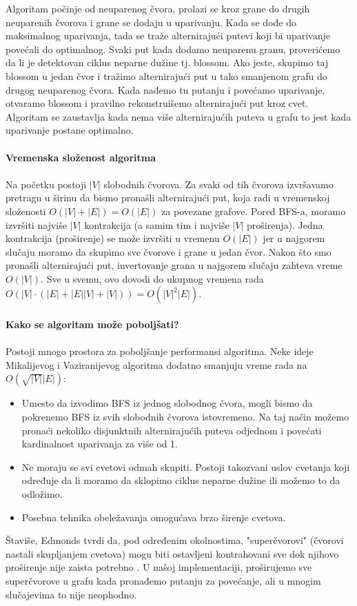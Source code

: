 \documentclass[a4paper]{article}
\theoremstyle{definition}
\begin{document}
Algoritam počinje od neuparenog čvora, prolazi se kroz grane do drugih neuparenih čvorova i grane se dodaju u uparivanju. Kada se dođe do maksimalnog uparivanja, tada se traže alternirajući putevi koji bi uparivanje povećali do optimalnog. Svaki put kada dodamo neuparenu granu, proverićemo da li je detektovan ciklus neparne dužine tj. blossom. Ako jeste, skupimo taj blossom u jedan čvor i tražimo alternirajući put u tako smanjenom grafu do drugog neuparenog čvora. Kada nađemo tu putanju i povećamo uparivanje, otvaramo blossom i pravilno rekonstruišemo alternirajući put kroz cvet.\\ Algoritam se zaustavlja kada nema više alternirajućih puteva u grafu to jest kada uparivanje postane optimalno.
\\
\\
\textbf{Vremenska složenost algoritma}\\ \\
Na početku postoji $|V|$ slobodnih čvorova. Za svaki od tih čvorova izvršavamo pretragu u širinu da bismo pronašli alternirajući put, koja radi u vremenskoj složenosti $O(|V|+|E|) = O(|E|)$ za povezane grafove. Pored BFS-a, moramo izvršiti najviše $|V|$ kontrakcija (a samim tim i najviše $|V|$ proširenja). Jedna kontrakcija (proširenje) se može izvršiti u vremenu $O(|E|)$ jer u najgorem slučaju moramo da skupimo sve čvorove i grane u jedan čvor. Nakon što smo pronašli alternirajući put, invertovanje grana u najgorem slučaju zahteva vreme $O(|V|)$. Sve u svemu, ovo dovodi do ukupnog vremena rada $O(|V| \cdot (|E|+|E||V|+|V|))=O(|V|^2|E|)$.
\\ \\
\textbf{Kako se algoritam može poboljšati?} \\ \\
Postoji mnogo prostora za poboljšanje performansi algoritma. Neke ideje Mikalijevog i Vaziranijevog algoritma dodatno smanjuju vreme rada na $O(\sqrt{|V|}|E|)$:
\begin{itemize}
\item Umesto da izvodimo BFS iz jednog slobodnog čvora, mogli bismo da pokrenemo BFS iz svih slobodnih čvorova istovremeno. Na taj način možemo pronaći nekoliko disjunktnih alternirajućih puteva odjednom i povećati kardinalnost uparivanja za više od 1.
\item Ne moraju se svi cvetovi odmah skupiti. Postoji takozvani uslov cvetanja koji određuje da li moramo da sklopimo ciklus neparne dužine ili možemo to da odložimo.
\item Posebna tehnika obeležavanja omogućava brzo širenje cvetova.
\end{itemize}
Štaviše, Edmonds tvrdi da, pod određenim okolnostima, "superčvorovi" (čvorovi nastali skupljanjem cvetova) mogu biti ostavljeni kontrahovani sve dok njihovo proširenje nije zaista potrebno \cite{knjiga2}. U našoj implementaciji, proširujemo sve superčvorove u grafu kada pronađemo putanju za povećanje, ali u mnogim slučajevima to nije neophodno.
\end{document}
